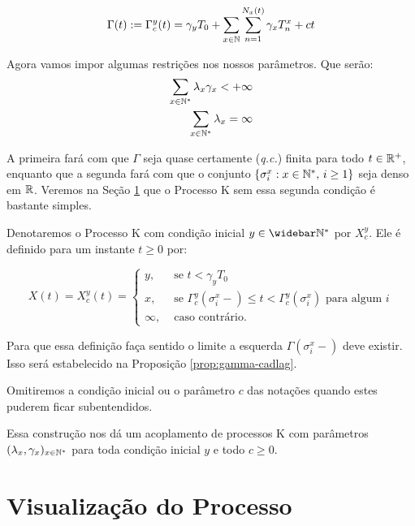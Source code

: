 \begin{equation}
  \label{def:Gamma}
  \Gamma(t) := \Gamma^y_c (t) = \gamma_y T_0
  + \sum_{x \in {\mathbb{N}}} \sum_{n = 1}^{N_x(t)}
  \gamma_x T_n^x
  + ct
\end{equation}

Agora vamos impor algumas restrições nos nossos parâmetros. Que serão:
\begin{align}
  \label{eq:rest-gamma-lambda}
  \sum_{x \in {\mathbb{N^*}}} \lambda_x\gamma_x < +\infty\\
  \label{eq:rest-lambda}
  \sum_{x \in {\mathbb{N^*}}} \lambda_x = \infty
\end{align}

A primeira fará com que $\Gamma$ seja quase certamente (\emph{q.c.}) finita
para todo $t \in {\mathbb{R}}^+$, enquanto que a segunda fará com que o conjunto
$\{\sigma^x_i: x \in {\mathbb{N^*}}, \, i \geq 1\}$ seja denso em ${\mathbb{R}}$. Veremos
na Seção \ref{sec:visualizacao} que o Processo K sem essa segunda
condição é bastante simples.

Denotaremos o Processo K com condição inicial $y \in \Nzb$ por
$X^y_c$. Ele é definido para um instante $t \geq 0$ por:

\begin{equation}
  \label{def:procK}
  X(t) = X^y_c (t) =
  \begin{cases}
    y, & \textrm{ se }  t < \gamma_y T_0\\
    x, & \textrm{ se } \Gamma^y_c(\sigma_i^x-) \leq t <
    \Gamma^y_c(\sigma^x_i)
    \textrm{ para algum } i \\
    \infty, & \textrm{ caso contrário.}
  \end{cases}
\end{equation}

Para que essa definição faça sentido o limite a esquerda $\Gamma
(\sigma_i^x-)$ deve existir. Isso será estabelecido na Proposição
\ref{prop:gamma-cadlag}.

Omitiremos a condição inicial ou o parâmetro $c$ das notações quando
estes puderem ficar subentendidos.

Essa construção nos dá um acoplamento de processos K com parâmetros
$(\lambda_x, \gamma_x)_{x \in {\mathbb{N^*}}}$ para toda condição inicial $y$ e
todo $c \geq 0$.



\section{Visualização do Processo}
\label{sec:visualizacao}

